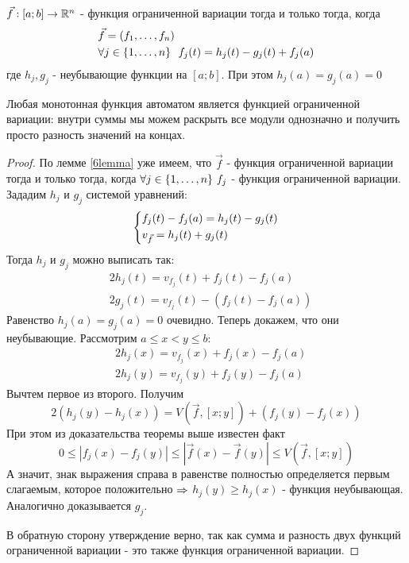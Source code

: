 \begin{corollary}
	$\vec{f}: [a; b] \to \mathbb{R}^n$ - функция ограниченной вариации тогда и только тогда, когда
	\begin{align*}
		&{\vec{f} = (f_1, \ldots, f_n)}
		\\
		&{\forall j \in \{1, \ldots, n\}\ \ f_j(t) = h_j(t) - g_j(t) + f_j(a)}
	\end{align*}
	где $h_j, g_j$ - неубывающие функции на $[a; b]$. При этом $h_j(a) = g_j(a) = 0$
\end{corollary}

\begin{note}
	Любая монотонная функция автоматом является функцией ограниченной вариации: внутри суммы мы можем раскрыть все модули однозначно и получить просто разность значений на концах.
\end{note}

\begin{proof}
	По лемме \ref{6lemma} уже имеем, что $\vec{f}$ - функция ограниченной вариации тогда и только тогда, когда $\forall j \in \{1, \ldots, n\}\ f_j$ - функция ограниченной вариации. Зададим $h_j$ и $g_j$ системой уравнений:
	\[
		\left\{\begin{aligned}
			&{f_j(t) - f_j(a) = h_j(t) - g_j(t)}
			\\
			&{v_{\vec{f}} = h_j(t) + g_j(t)}
		\end{aligned}\right.
	\]
	Тогда $h_j$ и $g_j$ можно выписать так:
	\begin{align*}
		&{2h_j(t) = v_{f_j}(t) + f_j(t) - f_j(a)}
		\\
		&{2g_j(t) = v_{f_j}(t) - (f_j(t) - f_j(a))}
	\end{align*}
	Равенство $h_j(a) = g_j(a) = 0$ очевидно. Теперь докажем, что они неубывающие. Рассмотрим $a \le x < y \le b$:
	\begin{align*}
		&{2h_j(x) = v_{f_j}(x) + f_j(x) - f_j(a)}
		\\
		&{2h_j(y) = v_{f_j}(y) + f_j(y) - f_j(a)}
	\end{align*}
	Вычтем первое из второго. Получим
	\[
		2(h_j(y) - h_j(x)) = V(\vec{f}, [x; y]) + \left(f_j(y) - f_j(x)\right)
	\]
	При этом из доказательства теоремы выше известен факт
	\[
		0 \le |f_j(x) - f_j(y)| \le |\vec{f}(x) - \vec{f}(y)| \le V(\vec{f}, [x; y])
	\]
	А значит, знак выражения справа в равенстве полностью определяется первым слагаемым, которое положительно $\Rightarrow$ $h_j(y) \ge h_j(x)$ - функция неубывающая. Аналогично доказывается $g_j$.
	
	В обратную сторону утверждение верно, так как сумма и разность двух функций ограниченной вариации - это также функция ограниченной вариации.
\end{proof}

